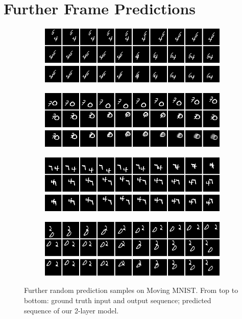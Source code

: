 \clearpage
\section{Further Frame Predictions}

\begin{figure}[htpb]
\centering
\begin{subfigure}{0.49\textwidth}
  \centering
  \includegraphics[width=0.92\linewidth]{figures/pred/mm/random/prediction-00.png}
  \caption{}
  \label{fig:mm-pred-random1}
\end{subfigure}%
\begin{subfigure}{0.49\textwidth}
  \centering
  \includegraphics[width=0.92\linewidth]{figures/pred/mm/random/prediction-01.png}
  \caption{}
  \label{fig:mm-pred-random2}
\end{subfigure}
\begin{subfigure}{0.49\textwidth}
  \centering
  \includegraphics[width=0.92\linewidth]{figures/pred/mm/random/prediction-02.png}
  \caption{}
  \label{fig:mm-pred-random3}
\end{subfigure}
\begin{subfigure}{0.49\textwidth}
  \centering
  \includegraphics[width=0.92\linewidth]{figures/pred/mm/random/prediction-03.png}
  \caption{}
  \label{fig:mm-pred-random4}
\end{subfigure}
\caption[Random Prediction Samples on Moving MNIST]{Further random prediction samples on Moving MNIST. From top to bottom: ground truth input and output sequence; predicted sequence of our 2-layer model.} \label{fig:mm-pred-random}
\end{figure}


